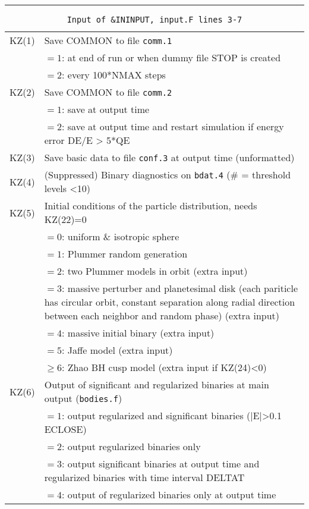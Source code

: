 \hrule
\noindent
\begin{longtable}{@{}p{1.5cm}p{13.0cm}}
\caption{\texttt{Input of \&ININPUT, input.F lines 3-7}}
\label{table:ininput37}\\\hline
%
KZ(1)   & Save COMMON to file \texttt{comm.1}\\
        & $=1$: at end of run or when dummy file STOP is created\\
        & $=2$: every 100*NMAX steps\\
KZ(2)   & Save COMMON to file \texttt{comm.2}\\
        & $=1$: save at output time\\
        & $=2$: save at output time and restart simulation if energy error DE/E > 5*QE\\
KZ(3)   & Save basic data to file \texttt{conf.3} at output time (unformatted)\\
KZ(4)   & (Suppressed) Binary diagnostics on \texttt{bdat.4} (\# = threshold levels <10)\\
KZ(5)   & Initial conditions of the particle distribution, needs KZ(22)=0\\
        & $=0$: uniform \& isotropic sphere\\
        & $=1$: Plummer random generation\\
        & $=2$: two Plummer models in orbit (extra input)\\
        & $=3$: massive perturber and planetesimal disk (each pariticle 
              has circular orbit, constant separation along 
              radial direction between each neighbor and random phase)
              (extra input)\\
        & $=4$: massive initial binary (extra input)\\
        & $=5$: Jaffe model (extra input) \\
        & $\ge 6$: Zhao BH cusp model (extra input if KZ(24)<0) \\
KZ(6)   & Output of significant and regularized binaries at main output (\texttt{bodies.f})\\
        & $=1$: output regularized and significant binaries (|E|>0.1 ECLOSE)\\
        & $=2$: output regularized binaries only\\
        & $=3$: output significant binaries at output time and regularized binaries with time interval DELTAT\\
        & $=4$: output of regularized binaries only at output time\\

\end{longtable}
